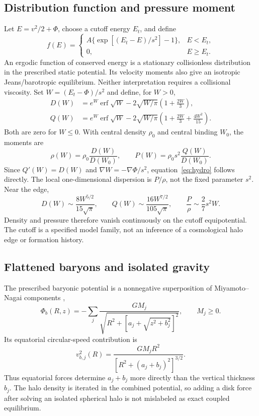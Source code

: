 \documentclass[10pt]{article}
\begin{document}
\subsection{Distribution function and pressure moment}
Let $E=v^2/2+\Phi$, choose a cutoff energy $E_t$, and define
\begin{equation}
 f(E)=\begin{cases}
 A\{\exp[(E_t-E)/s^2]-1\},&E<E_t,\\
 0,&E\geq E_t.
 \end{cases}
 \label{eq:king}
\end{equation}
An ergodic function of conserved energy is a stationary collisionless
distribution in the prescribed static potential. Its velocity moments also
give an isotropic Jeans/barotropic equilibrium. Neither interpretation
requires a collisional viscosity. Set $W=(E_t-\Phi)/s^2$ and define, for $W>0$,
\begin{align}
 D(W)&=e^W\operatorname{erf}\sqrt W-
 2\sqrt{W/\pi}\left(1+\frac{2W}{3}\right),\\
 Q(W)&=e^W\operatorname{erf}\sqrt W-
 2\sqrt{W/\pi}\left(1+\frac{2W}{3}+\frac{4W^2}{15}\right).
\end{align}
Both are zero for $W\leq0$. With central density $\rho_0$ and central binding
$W_0$, the moments are
\begin{equation}
 \rho(W)=\rho_0\frac{D(W)}{D(W_0)},\qquad
 P(W)=\rho_0s^2\frac{Q(W)}{D(W_0)}.
\end{equation}
Since $Q'(W)=D(W)$ and $\nabla W=-\nabla\Phi/s^2$, equation~\eqref{eq:hydro}
follows directly. The local one-dimensional dispersion is $P/\rho$, not
the fixed parameter $s^2$. Near the edge,
\begin{equation}
 D(W)\sim\frac{8W^{5/2}}{15\sqrt\pi},\qquad
 Q(W)\sim\frac{16W^{7/2}}{105\sqrt\pi},\qquad
 \frac{P}{\rho}\sim\frac{2}{7}s^2W.
\end{equation}
Density and pressure therefore vanish continuously on the cutoff
equipotential. The cutoff is a specified model family, not an inference
of a cosmological halo edge or formation history.

\subsection{Flattened baryons and isolated gravity}
The prescribed baryonic potential is a nonnegative superposition of
Miyamoto--Nagai components \citep{miyamoto1975},
\begin{equation}
 \Phi_b(R,z)=-\sum_j\frac{GM_j}
 {\sqrt{R^2+[a_j+\sqrt{z^2+b_j^2}]^2}},\qquad M_j\geq0.
\end{equation}
Its equatorial circular-speed contribution is
\begin{equation}
 v_{b,j}^2(R)=\frac{GM_jR^2}{[R^2+(a_j+b_j)^2]^{3/2}}.
\end{equation}
Thus equatorial forces determine $a_j+b_j$ more directly than the vertical
thickness $b_j$. The halo density is iterated in the combined potential, so
adding a disk force after solving an isolated spherical halo is not mislabeled
as exact coupled equilibrium.
\end{document}
